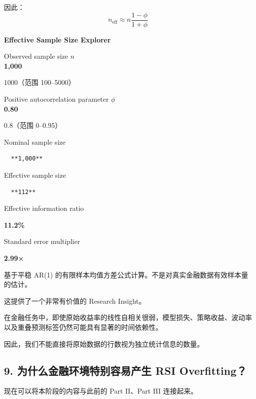 因此：
\[\boxed{
n_{\mathrm{eff}}
\approx
n\frac{1-\phi}{1+\phi}
}\]

\textbf{Effective Sample Size Explorer}

Observed sample size \(n\)\\
\textbf{1,000}

1000（范围 100--5000）

Positive autocorrelation parameter \(\phi\)\\
\textbf{0.80}

0.8（范围 0--0.95）

Nominal sample size

\begin{verbatim}
  **1,000**
\end{verbatim}

Effective sample size

\begin{verbatim}
  **112**
\end{verbatim}

Effective information ratio

\textbf{11.2\%}

Standard error multiplier

\textbf{2.99×}

基于平稳 AR(1) 的有限样本均值方差公式计算。不是对真实金融数据有效样本量的估计。

这提供了一个非常有价值的 Research Insight。

在金融任务中，即使原始收益率的线性自相关很弱，模型损失、策略收益、波动率以及重叠预测标签仍然可能具有显著的时间依赖性。

因此，我们不能直接将原始数据的行数视为独立统计信息的数量。

\hypertarget{part-4-52-0680-ux4e3aux4ec0ux4e48ux91d1ux878dux73afux5883ux7279ux522bux5bb9ux6613ux4ea7ux751f-rsi-overfitting}{%
\subsection{9. 为什么金融环境特别容易产生 RSI Overfitting？}\label{part-4-52-0680-ux4e3aux4ec0ux4e48ux91d1ux878dux73afux5883ux7279ux522bux5bb9ux6613ux4ea7ux751f-rsi-overfitting}}

现在可以将本阶段的内容与此前的 Part II、Part III 连接起来。

